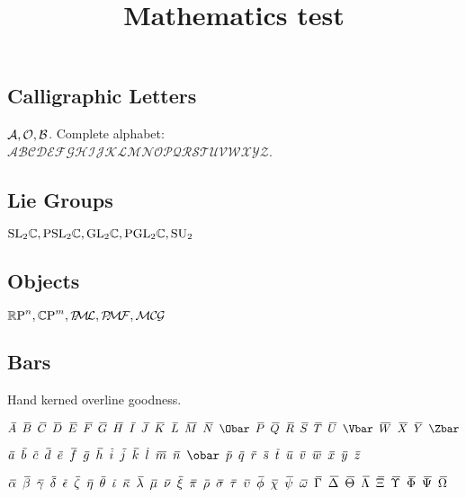 \documentclass[noaddress, tikz]{nmd/article}
\title{Mathematics test}
\begin{document}
\maketitle

\subsection*{Calligraphic Letters}  ${\mathcal A}, {\mathcal O}, {\mathcal B}$.  Complete
alphabet: \\
$\mathcal{ABCDEFGHIJKLMNOPQRSTUVWXYZ}$.

\subsection*{Lie Groups}  $\mathrm{ SL}_{2} {\mathbb C}, \mathrm{PSL}_{2} {\mathbb C}, \mathrm{GL}_{2} {\mathbb C},
\mathrm{PGL}_{2} {\mathbb C}, \mathrm{SU}_2$

\subsection*{Objects} $\RP^n, \CP^m, \PML, \PMF, \MCG$

\subsection*{Bars} Hand kerned overline goodness.  

$\Abar \enskip \Bbar \enskip \Cbar \enskip \Dbar
\enskip \Ebar \enskip \Fbar \enskip \Gbar \enskip \Hbar \enskip \Ibar
\enskip \Jbar \enskip \Kbar \enskip \Lbar \enskip \Mbar \enskip \Nbar
\enskip \Obar \enskip \Pbar \enskip \Qbar \enskip \Rbar \enskip \Sbar
\enskip \Tbar \enskip \Ubar \enskip \Vbar \enskip \Wbar \enskip \Xbar
\enskip \Ybar \enskip \Zbar$

$\abar \enskip \bbar \enskip \cbar \enskip \dbar \enskip \ebar \enskip
\fbar \enskip \gbar \enskip \hhbar \enskip \ibar \enskip \jbar \enskip \kbar
\enskip \lbar \enskip \mbar \enskip \nbar \enskip \obar \enskip \pbar
\enskip \qbar \enskip \rbar \enskip \sbar \enskip \tbar \enskip \ubar
\enskip \vbar \enskip \wbar \enskip \xbar \enskip \ybar \enskip \zbar$

$\alphabar \enskip \betabar \enskip \gammabar \enskip \deltabar \enskip \epsilonbar \enskip \zetabar \enskip \etabar \enskip \thetabar \enskip \iotabar \enskip \kappabar \enskip \lambdabar \enskip \mubar \enskip \nubar \enskip \xibar \enskip \pibar \enskip \rhobar \enskip \sigmabar \enskip \taubar \enskip \upsilonbar \enskip \phibar \enskip \chibar \enskip \psibar \enskip \omegabar \enskip \Gammabar \enskip \Deltabar \enskip \Thetabar \enskip \Lambdabar \enskip \Xibar \enskip \Upsilonbar \enskip \Phibar \enskip \Psibar \enskip \Omegabar$
\end{document}
